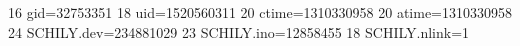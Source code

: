 16 gid=32753351
18 uid=1520560311
20 ctime=1310330958
20 atime=1310330958
24 SCHILY.dev=234881029
23 SCHILY.ino=12858455
18 SCHILY.nlink=1
